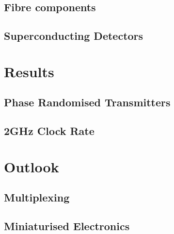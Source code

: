 \subsection{Fibre components}

\subsection{Superconducting Detectors}

\section{Results}

\subsection{Phase Randomised Transmitters}

\subsection{2GHz Clock Rate}

\section{Outlook}

\subsection{Multiplexing}

\subsection{Miniaturised Electronics}


